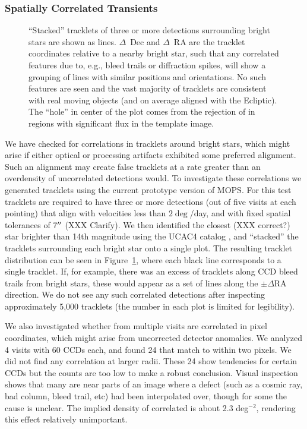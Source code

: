 \subsubsection{Spatially Correlated Transients}

\begin{figure}
  \centering
  \caption{
  ``Stacked'' tracklets of three or more detections surrounding bright stars are shown 
    as lines. $\Delta$~Dec and $\Delta$~RA are the tracklet coordinates relative to a nearby
  bright star, such that any correlated features due to, e.g., bleed trails or
  diffraction spikes, will show a grouping of lines with similar positions and
  orientations. No such features are seen and the vast majority of
  tracklets are consistent with real moving objects (and on average aligned with
  the Ecliptic). The ``hole'' in center of the plot comes from the rejection of \DIASources
  in regions with significant flux in the template image.
  }
  \label{fig:stacked_tracklets}
\end{figure}

We have checked for correlations in tracklets around bright stars, which
might arise if either optical or processing artifacts exhibited some preferred
alignment. Such an alignment may create false tracklets at a rate greater than
an overdensity of uncorrelated detections would. To investigate these
correlations we generated tracklets using the current prototype version of MOPS.
For this test tracklets are required to have three or more detections (out of five visits
at each pointing) that align with velocities less than $2\deg$/day, and with
fixed spatial tolerances of $7\mbox{$^{\prime\prime}$}$ (XXX Clarify). We then identified the closest (XXX correct?)
star brighter than 14th magnitude using the UCAC4 catalog \citep{UCAC4}, and ``stacked'' the
tracklets surrounding each bright star onto a single plot. The resulting tracklet distribution can
be seen in Figure~\ref{fig:stacked_tracklets}, where each black line corresponds to a
single tracklet. If, for example, there was an excess of tracklets along CCD
bleed trails from bright stars, these would appear as a set of lines along the
$\pm\Delta \textrm{RA}$ direction. We do not see any such correlated detections after
inspecting approximately 5,000 tracklets (the number in each plot is limited for
legibility).

We also investigated whether \DIASources from multiple visits are correlated
in pixel coordinates, which might arise from uncorrected detector anomalies.
We analyzed 4 visits with 60 CCDs each,
and found 24 \DIASources that match to within two pixels. We did not find any correlation at
larger radii. These 24 \DIASources show tendencies for certain CCDs but the counts are too
low to make a robust conclusion. Visual inspection shows that many are near
parts of an image where a defect (such as a cosmic ray, bad column, bleed trail,
etc) had been interpolated over, though for some the cause is unclear. The
implied density of correlated
\DIASources is about 2.3 deg$^{-2}$, rendering this effect relatively unimportant.


